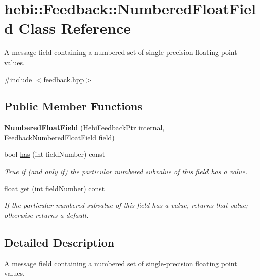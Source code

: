 \hypertarget{classhebi_1_1Feedback_1_1NumberedFloatField}{}\section{hebi\+:\+:Feedback\+:\+:Numbered\+Float\+Field Class Reference}
\label{classhebi_1_1Feedback_1_1NumberedFloatField}


A message field containing a numbered set of single-\/precision floating point values.  




{\ttfamily \#include $<$feedback.\+hpp$>$}

\subsection*{Public Member Functions}
\begin{DoxyCompactItemize}
\item 
{\bfseries Numbered\+Float\+Field} (Hebi\+Feedback\+Ptr internal, Feedback\+Numbered\+Float\+Field field)\hypertarget{classhebi_1_1Feedback_1_1NumberedFloatField_ac9d5422a9e1b1eb5ad2a3de5d835f6a4}{}\label{classhebi_1_1Feedback_1_1NumberedFloatField_ac9d5422a9e1b1eb5ad2a3de5d835f6a4}

\item 
bool \hyperlink{classhebi_1_1Feedback_1_1NumberedFloatField_ae2e53d1949ac7d54fcca94bbad106917}{has} (int field\+Number) const 
\begin{DoxyCompactList}\small\item\em True if (and only if) the particular numbered subvalue of this field has a value. \end{DoxyCompactList}\item 
float \hyperlink{classhebi_1_1Feedback_1_1NumberedFloatField_a32b65ae3bb8106155364b4e3a1fc2a1d}{get} (int field\+Number) const 
\begin{DoxyCompactList}\small\item\em If the particular numbered subvalue of this field has a value, returns that value; otherwise returns a default. \end{DoxyCompactList}\end{DoxyCompactItemize}


\subsection{Detailed Description}
A message field containing a numbered set of single-\/precision floating point values. 

